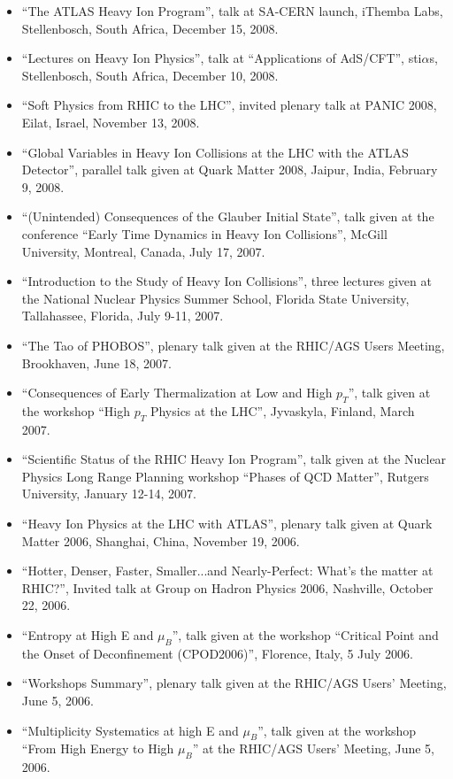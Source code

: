 \documentclass[11 pt]{article}
\begin{document}
\begin{description}
\begin{itemize}
\item ``The ATLAS Heavy Ion Program'', talk at SA-CERN launch, iThemba Labs, Stellenbosch, South Africa, December 15, 2008.
\item ``Lectures on Heavy Ion Physics'', talk at ``Applications of AdS/CFT'', sti$\alpha$s, Stellenbosch, South Africa, December 10, 2008.
\item ``Soft Physics from RHIC to the LHC'', invited plenary talk at PANIC 2008, Eilat, Israel, November 13, 2008.
\item ``Global Variables in Heavy Ion Collisions at the LHC with the ATLAS Detector'', parallel talk given at Quark Matter 2008, Jaipur, India, February 9, 2008.
\item ``(Unintended) Consequences of the Glauber Initial State'', talk given at the conference ``Early Time Dynamics in Heavy Ion Collisions'', McGill University, Montreal, Canada, July 17, 2007.
\item ``Introduction to the Study of Heavy Ion Collisions'', three lectures given at the National Nuclear Physics Summer School, Florida State University, Tallahassee, Florida, July 9-11, 2007.
\item ``The Tao of PHOBOS'', plenary talk given at the RHIC/AGS Users Meeting, Brookhaven, June 18, 2007.
\item ``Consequences of Early Thermalization at Low and High $p_T$'', talk given at the workshop ``High $p_T$ Physics at the LHC'', Jyvaskyla, Finland, March 2007.
\item ``Scientific Status of the RHIC Heavy Ion Program'', talk given at the Nuclear Physics Long Range Planning workshop ``Phases of QCD Matter'', Rutgers University, January 12-14, 2007.
\item ``Heavy Ion Physics at the LHC with ATLAS'', plenary talk given at Quark Matter 2006, Shanghai, China, November 19, 2006.
\item ``Hotter, Denser, Faster, Smaller...and Nearly-Perfect: What's the matter at RHIC?'', Invited talk at Group on Hadron Physics 2006, Nashville, October 22, 2006.
\item ``Entropy at High E and $\mu_B$'', talk given at the workshop ``Critical Point and the Onset of Deconfinement (CPOD2006)'', Florence, Italy, 5 July 2006.
\item ``Workshops Summary'', plenary talk given at the RHIC/AGS Users' Meeting, June 5, 2006.
\item ``Multiplicity Systematics at high E and $\mu_B$'', talk given at the workshop ``From High Energy to High $\mu_B$'' at the RHIC/AGS Users' Meeting, June 5, 2006.

\end{itemize}
\end{description}
\end{document}
